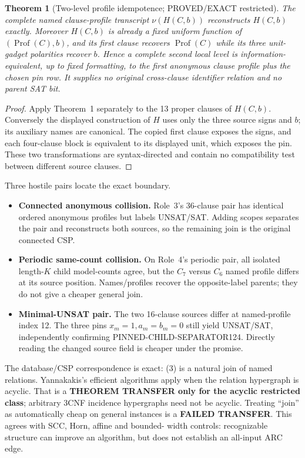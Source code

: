\documentclass[11pt]{article}
\newtheorem{theorem}{Theorem}
\newcommand{\Prof}{\operatorname{Prof}}
\begin{document}
\begin{theorem}[Two-level profile idempotence; PROVED/EXACT restricted]
The complete named clause-profile transcript $\nu(H(C,b))$ reconstructs
$H(C,b)$ exactly.  Moreover $H(C,b)$ is already a fixed uniform function
of $(\Prof(C),b)$, and its first clause recovers $\Prof(C)$ while its three
unit-gadget polarities recover $b$.  Hence a complete second local level is
information-equivalent, up to fixed formatting, to the first anonymous
clause profile plus the chosen pin row.  It supplies no original
cross-clause identifier relation and no parent SAT bit.
\end{theorem}
\begin{proof}
Apply Theorem~1 separately to the 13 proper clauses of $H(C,b)$.  Conversely
the displayed construction of $H$ uses only the three source signs and
$b$; its auxiliary names are canonical.  The copied first clause exposes
the signs, and each four-clause block is equivalent to its displayed unit,
which exposes the pin.  These two transformations are syntax-directed and
contain no compatibility test between different source clauses.
\end{proof}

Three hostile pairs locate the exact boundary.
\begin{itemize}
\item \textbf{Connected anonymous collision.}  Role~3's 36-clause pair has
identical ordered anonymous profiles but labels UNSAT/SAT.  Adding scopes
separates the pair and reconstructs both sources, so the remaining join is
the original connected CSP.
\item \textbf{Periodic same-count collision.}  On Role~4's periodic pair,
all isolated length-$K$ child model-counts agree, but the $C_7$ versus
$C_6$ named profile differs at its source position.  Names/profiles recover
the opposite-label parents; they do not give a cheaper general join.
\item \textbf{Minimal-UNSAT pair.}  The two 16-clause sources differ at
named-profile index 12.  The three pins $x_m=1,a_m=b_m=0$ still yield
UNSAT/SAT, independently confirming PINNED-CHILD-SEPARATOR124.  Directly
reading the changed source field is cheaper under the promise.
\end{itemize}

The database/CSP correspondence is exact: (3) is a natural join of named
relations.  Yannakakis's efficient algorithms apply when the relation
hypergraph is acyclic.  That is a \textbf{THEOREM TRANSFER only for the
acyclic restricted class}; arbitrary 3CNF incidence hypergraphs need not be
acyclic.  Treating ``join'' as automatically cheap on general instances is
a \textbf{FAILED TRANSFER}.  This agrees with SCC, Horn, affine and bounded-
width controls: recognizable structure can improve an algorithm, but does
not establish an all-input ARC edge.
\end{document}
